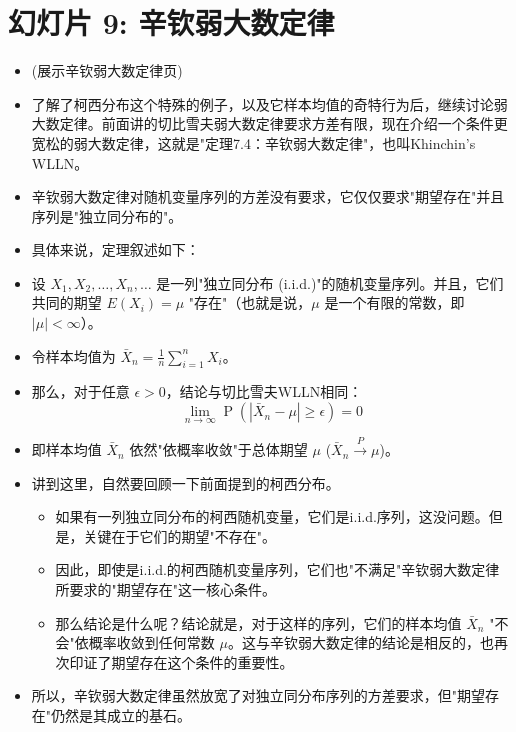 \documentclass[UTF8]{article} %
\DeclareMathOperator{\Prob}{\operatorname{P}}
\begin{document}
\section*{幻灯片 9: 辛钦弱大数定律}
\begin{itemize}
    \itemsep1em
    \item (展示辛钦弱大数定律页)
    \item 了解了柯西分布这个特殊的例子，以及它样本均值的奇特行为后，继续讨论弱大数定律。前面讲的切比雪夫弱大数定律要求方差有限，现在介绍一个条件更宽松的弱大数定律，这就是"定理7.4：辛钦弱大数定律"，也叫Khinchin's WLLN。
    \item 辛钦弱大数定律对随机变量序列的方差没有要求，它仅仅要求"期望存在"并且序列是"独立同分布的"。
    \item 具体来说，定理叙述如下：
    \item 设 $X_1, X_2, \dots, X_n, \dots$ 是一列"独立同分布 (i.i.d.)"的随机变量序列。并且，它们共同的期望 $E(X_i) = \mu$ "存在"（也就是说，$\mu$ 是一个有限的常数，即 $|\mu| < \infty$）。
    \item 令样本均值为 $\bar{X}_n = \frac{1}{n} \sum_{i=1}^{n} X_i$。
    \item 那么，对于任意 $\epsilon > 0$，结论与切比雪夫WLLN相同：
    \[ \lim_{n \to \infty} \Prob(|\bar{X}_n - \mu| \geq \epsilon) = 0 \]
    \item 即样本均值 $\bar{X}_n$ 依然"依概率收敛"于总体期望 $\mu$ ($\bar{X}_n \xrightarrow{P} \mu$)。
    \item 讲到这里，自然要回顾一下前面提到的柯西分布。
    \begin{itemize}[label=\textbullet, itemsep=0.3em]
        \item 如果有一列独立同分布的柯西随机变量，它们是i.i.d.序列，这没问题。但是，关键在于它们的期望"不存在"。
        \item 因此，即使是i.i.d.的柯西随机变量序列，它们也"不满足"辛钦弱大数定律所要求的"期望存在"这一核心条件。
        \item 那么结论是什么呢？结论就是，对于这样的序列，它们的样本均值 $\bar{X}_n$ "不会"依概率收敛到任何常数 $\mu$。这与辛钦弱大数定律的结论是相反的，也再次印证了期望存在这个条件的重要性。
    \end{itemize}
    \item 所以，辛钦弱大数定律虽然放宽了对独立同分布序列的方差要求，但"期望存在"仍然是其成立的基石。
\end{itemize}
\end{document}
